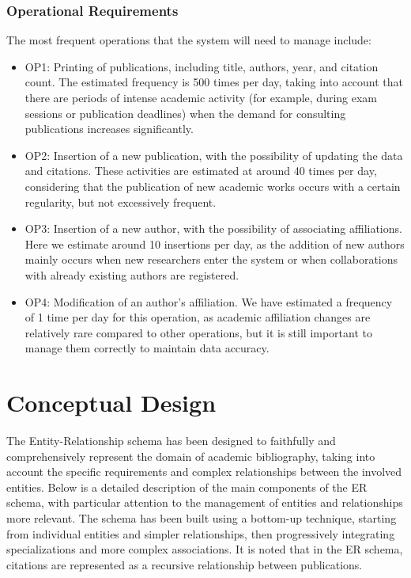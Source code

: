 \documentclass[a4paper,12pt]{article}
\begin{document}
\subsubsection{Operational Requirements}
The most frequent operations that the system will need to manage include:
\begin{itemize}[label=\textbullet]
    \item OP1: Printing of publications, including title, authors, year, and citation count. The estimated frequency is 500 times per day, taking into account that there are periods of intense academic activity (for example, during exam sessions or publication deadlines) when the demand for consulting publications increases significantly.
    \item OP2: Insertion of a new publication, with the possibility of updating the data and citations. These activities are estimated at around 40 times per day, considering that the publication of new academic works occurs with a certain regularity, but not excessively frequent.
    \item OP3: Insertion of a new author, with the possibility of associating affiliations. Here we estimate around 10 insertions per day, as the addition of new authors mainly occurs when new researchers enter the system or when collaborations with already existing authors are registered.
    \item OP4: Modification of an author's affiliation. We have estimated a frequency of 1 time per day for this operation, as academic affiliation changes are relatively rare compared to other operations, but it is still important to manage them correctly to maintain data accuracy.
\end{itemize} 

\section{Conceptual Design} \label{sec:progettazione-concettuale}
The Entity-Relationship schema has been designed to faithfully and comprehensively represent the domain of academic bibliography, taking into account the specific requirements and complex relationships between the involved entities. Below is a detailed description of the main components of the ER schema, with particular attention to the management of entities and relationships more relevant. The schema has been built using a bottom-up technique, starting from individual entities and simpler relationships, then progressively integrating specializations and more complex associations. It is noted that in the ER schema, citations are represented as a recursive relationship between publications.
\end{document}

